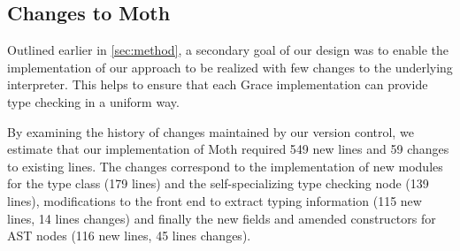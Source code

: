 \subsection{Changes to Moth}

Outlined earlier in \cref{sec:method}, a secondary
goal of our design was to enable the implementation of our approach to be
realized with few changes to the underlying interpreter.
This helps to ensure that each Grace implementation
can provide type checking in a uniform way.

By examining the history of changes maintained by our version control,
we estimate that our implementation of Moth required
549 new lines and 59 changes to existing lines.
The changes correspond to the implementation of
new modules for the type class (179 lines) and
the self-specializing type checking node (139 lines),
modifications to the front end to extract typing information
(115 new lines, 14 lines changes)
and finally the new fields and amended constructors for AST nodes
(116 new lines, 45 lines changes).




